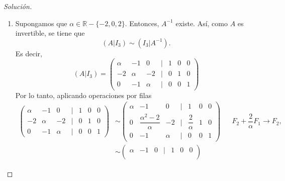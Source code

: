 \documentclass[a4,11pt]{aleph-notas}
\begin{document}
\begin{proof}[Solución]
\begin{enumerate}
    
    \item Supongamos que $\alpha \in \mathbb{R}-\{-2, 0, 2\}$. Entonces, $A^{-1}$ existe. Así, como $A$ es invertible, se tiene que 
    \[
        (A|I_3)\sim (I_3|A^{-1}).
    \]
    Es decir, 
    \[
        (A|I_3) =  \begin{pmatrix}
                \alpha & -1 & 0 & | & 1 & 0 & 0 \\
                -2 & \alpha & -2 & | & 0 & 1 & 0\\
                0 & -1 & \alpha & | & 0 & 0 & 1
            \end{pmatrix}
    \]
    Por lo tanto, aplicando operaciones por filas
    \begin{align*}
         \begin{pmatrix}
                \alpha & -1 & 0 & | & 1 & 0 & 0 \\
                -2 & \alpha & -2 & | & 0 & 1 & 0\\
                0 & -1 & \alpha & | & 0 & 0 & 1
            \end{pmatrix} &\sim  \begin{pmatrix}
                \alpha & -1 & 0 & | & 1 & 0 & 0 \\
                0 & \dfrac{\alpha^2-2}{\alpha} & -2 & | & \dfrac{2}{\alpha} & 1 & 0\\
                0 & -1 & \alpha & | & 0 & 0 & 1
            \end{pmatrix} && F_2 + \dfrac{2}{\alpha} F_1 \rightarrow F_2, \\
            & \sim \begin{pmatrix}
                \alpha & -1 & 0 & | & 1 & 0 & 0 \\

\end{pmatrix}
\end{align*}
\end{enumerate}
\end{proof}
\end{document}
